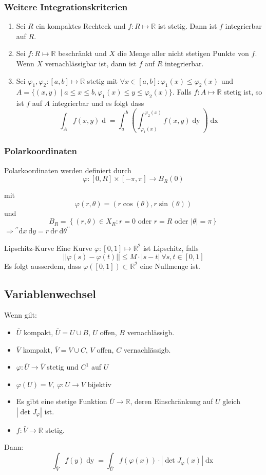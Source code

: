 \documentclass[a4paper,10pt]{article}
\def\R{\mathbb{R}}
\begin{document}
\subsubsection*{Weitere Integrationskriterien}
\begin{enumerate}
    \item Sei $R$ ein kompaktes Rechteck und $f: R \mapsto \R$ ist stetig. Dann ist $f$ integrierbar auf $R$.
    \item Sei $f: R \mapsto \R$ beschränkt und $X$ die Menge aller nicht stetigen Punkte von $f$. Wenn $X$ vernachlässigbar ist, dann ist $f$ auf $R$ integrierbar.
    \item Sei $\varphi_1, \varphi_2: \left[a,b\right]\mapsto \R$ stetig mit $\forall x \in \left[a,b\right]: \varphi_1(x) \le \varphi_2(x)$ und $A = \{(x,y)\mid a\le x \le b, \varphi_1(x) \le y \le \varphi_2(x)\}$. Falls $f: A \mapsto \R$ stetig ist, so ist $f$ auf $A$ integrierbar und es folgt dass
            $$\int_A f(x,y) \mathop{d(x,y)} = \int_a^b \left(\int_{\varphi_1(x)}^{\varphi_2(x)} f(x,y) \mathop{dy}\right) \mathop{dx}$$
\end{enumerate}

\subsubsection*{Polarkoordinaten}
Polarkoordinaten werden definiert durch
$$
\varphi: [0, R] \times[-\pi, \pi] \rightarrow B_{R}(0)
$$

mit
$$
\varphi(r, \theta)=(r \cos (\theta), r \sin (\theta))
$$
und
$$
B_R=\left\{(r, \theta) \in X_R: r=0 \text { oder } r=R \text { oder }|\theta|=\pi\right\}
$$
$\Rightarrow{ }^{\prime \prime} \text{d}x \ \text{d}y=r \ \text{d}r \ \text{d}\theta^{\prime \prime}$

\begin{subbox}{Lipschitz-Kurve}
    Eine Kurve $\varphi : \left[0, 1\right] \mapsto \R^2$ ist Lipschitz, falls
    $$||\varphi(s) - \varphi(t)|| \le M \cdot |s-t| \ \forall s,t \in \left[0,1\right]$$
    Es folgt ausserdem, dass $\varphi(\left[0,1\right]) \subset \R^2$ eine Nullmenge ist.
\end{subbox}

\subsection{Variablenwechsel}
Wenn gilt:
\begin{itemize}
	\item $\bar U$ kompakt, $\bar U =U\cup B$, $U$ offen, $B$ vernachlässigb.
	\item $\bar V$ kompakt, $\bar V =V\cup C$, $V$ offen, $C$ vernachlässigb.
	\item $\varphi: \bar U \to \bar V$ stetig und $C^1$ auf $U$
	\item $\varphi(U)=V,\ \varphi:U\to V$ bijektiv
	\item Es gibt eine stetige Funktion $\bar U \to \R$, deren Einschränkung auf $U$ gleich $|\det J_\varphi|$ ist.
	\item $f:\bar V \to \R$ stetig.
\end{itemize}
Dann:
$$\int_{\bar V} f(y) \mathop{dy} = \int_{\bar U} f(\varphi(x)) \cdot \left|\det J_\varphi (x)\right| \mathop{dx}$$
\end{document}
